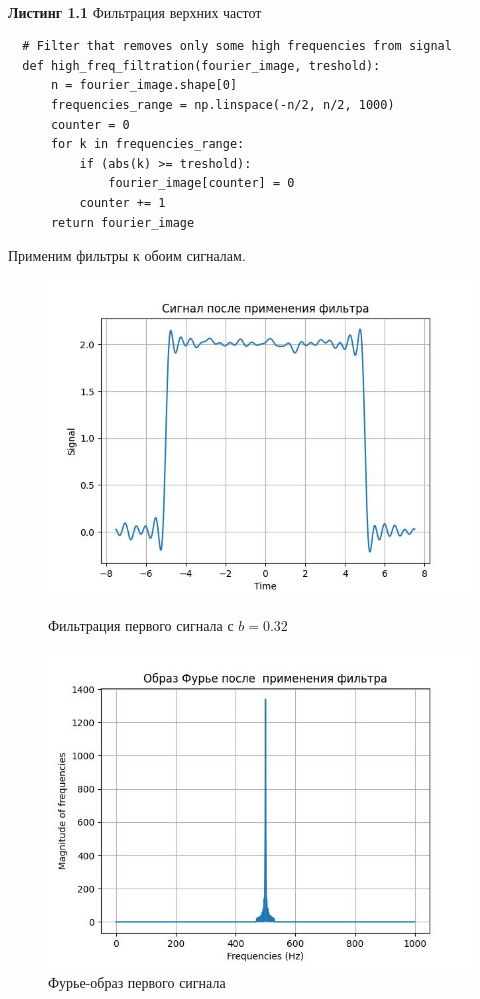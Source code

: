   \\
  \textbf{Листинг 1.1} Фильтрация верхних частот
  \begin{lstlisting}
  # Filter that removes only some high frequencies from signal
  def high_freq_filtration(fourier_image, treshold):
      n = fourier_image.shape[0]
      frequencies_range = np.linspace(-n/2, n/2, 1000)
      counter = 0
      for k in frequencies_range:
          if (abs(k) >= treshold):
              fourier_image[counter] = 0
          counter += 1
      return fourier_image
  \end{lstlisting}
  \noindent Применим фильтры к обоим сигналам.
  \begin{figure}[!htb]
      \includegraphics[width=\linewidth]{../images/result/high_freq1.jpeg}
      \caption{Фильтрация первого сигнала с $b = 0.32$}
    \endminipage\hfill
      \includegraphics[width=\linewidth]{../images/result/high_freq1_fourier.jpeg}
      \caption{Фурье-образ первого сигнала}
    \endminipage\hfill
    \end{figure}

